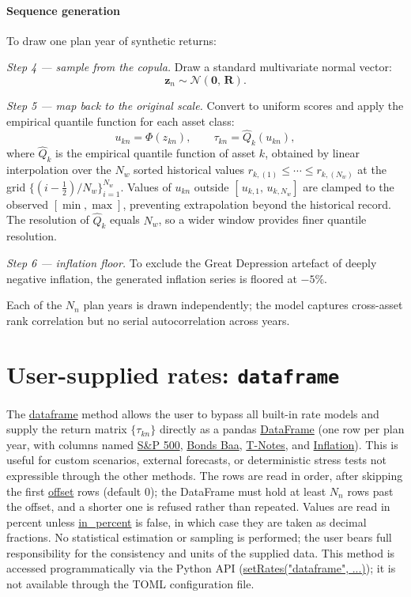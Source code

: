 \documentclass[fleqn,12pt]{report}
\newcommand{\code}[1]{\url{#1}}
\begin{document}
\paragraph*{Sequence generation}
To draw one plan year of synthetic returns:

\textit{Step 4 --- sample from the copula.}
Draw a standard multivariate normal vector:
\begin{equation}
    \bm{z}_n \sim \mathcal{N}(\bm{0},\, \bm{R}).
    \label{Eq:CopulaSample}
\end{equation}

\textit{Step 5 --- map back to the original scale.}
Convert to uniform scores and apply the empirical quantile function
for each asset class:
\begin{equation}
    u_{kn} = \Phi(z_{kn}), \qquad
    \tau_{kn} = \hat{Q}_k(u_{kn}),
    \label{Eq:CopulaBackTransform}
\end{equation}
where $\hat{Q}_k$ is the empirical quantile function of asset $k$, obtained
by linear interpolation over the $N_w$ sorted historical values
$r_{k,(1)} \le \cdots \le r_{k,(N_w)}$ at the grid
$\{(i - \tfrac{1}{2})/N_w\}_{i=1}^{N_w}$.
Values of $u_{kn}$ outside $[\,u_{k,1},\, u_{k,N_w}]$ are clamped to the
observed $[\min, \max]$, preventing extrapolation beyond the historical record.
The resolution of $\hat{Q}_k$ equals $N_w$, so a wider window provides finer
quantile resolution.

\textit{Step 6 --- inflation floor.}
To exclude the Great Depression artefact of deeply negative inflation,
the generated inflation series is floored at $-5\%$.

Each of the $N_n$ plan years is drawn independently; the model captures
cross-asset rank correlation but no serial autocorrelation across years.

\section{User-supplied rates: \texttt{dataframe}}

The \code{dataframe} method allows the user to bypass all built-in rate
models and supply the return matrix $\{\tau_{kn}\}$ directly as a
pandas \code{DataFrame} (one row per plan year, with columns named
\code{S&P 500}, \code{Bonds Baa}, \code{T-Notes}, and \code{Inflation}).
This is useful for custom scenarios, external forecasts, or deterministic
stress tests not expressible through the other methods.
The rows are read in order, after skipping the first \code{offset} rows (default 0);
the DataFrame must hold at least $N_n$ rows past the offset, and a shorter one is refused
rather than repeated.
Values are read in percent unless \code{in_percent} is false, in which case they are
taken as decimal fractions.
No statistical estimation or sampling is performed; the user bears full
responsibility for the consistency and units of the supplied data.
This method is accessed programmatically via the Python API
(\code{setRates("dataframe", ...)}); it is not available through the
TOML configuration file.
\end{document}
